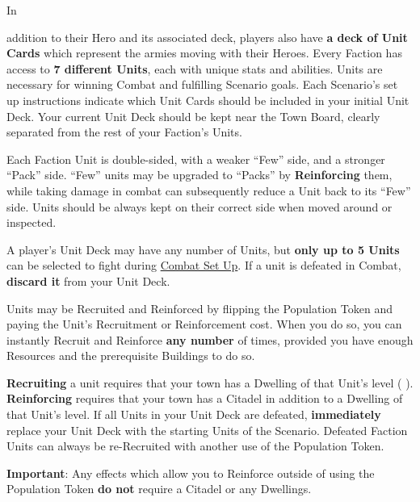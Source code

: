 
\begin{multicols*}{2}

\hypertarget{Units}{In} addition to their Hero and its associated deck, players also have \textbf{a deck of Unit Cards} which represent the armies moving with their Heroes.
Every Faction has access to \textbf{7 different Units}, each with unique stats and abilities.
Units are necessary for winning Combat and fulfilling Scenario goals.
Each Scenario's set up instructions indicate which Unit Cards should be included in your initial Unit Deck.
Your current Unit Deck should be kept near the Town Board, clearly separated from the rest of your Faction's Units.\par
Each Faction Unit is double-sided, with a weaker “Few” side, and a stronger “Pack” side.
“Few” units may be upgraded to “Packs” by \textbf{Reinforcing} them, while taking damage in combat can subsequently reduce a Unit back to its “Few” side.
Units should be always kept on their correct side when moved around or inspected.\par
A player's Unit Deck may have any number of Units, but \textbf{only up to 5 Units} can be selected to fight during \hyperlink{Combatsetup}{Combat Set Up}.
If a unit is defeated in Combat, \textbf{discard it} from your Unit Deck.\par
Units may be Recruited and Reinforced by flipping the Population Token and paying the Unit's Recruitment  or Reinforcement  cost.
When you do so, you can instantly Recruit and Reinforce \textbf{any number} of times, provided you have enough Resources and the prerequisite Buildings to do so.\par

\textbf{Recruiting} a unit requires that your town has a Dwelling of that Unit's level ( ).
\textbf{Reinforcing} requires that your town has a Citadel in addition to a Dwelling of that Unit's level.
If all Units in your Unit Deck are defeated, \textbf{immediately} replace your Unit Deck with the starting Units of the Scenario. Defeated Faction Units can always be re-Recruited with another use of the Population Token.\par

\textbf{Important}: Any effects which allow you to Reinforce outside of using the Population Token \textbf{do not} require a Citadel or any Dwellings.


\end{multicols*}
